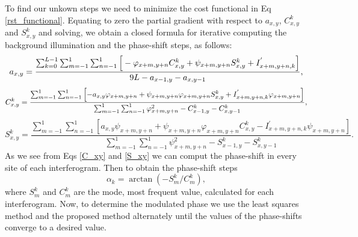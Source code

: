 \documentclass[letterpaper,12pt]{article}   %
\begin{document}
To find our unkown steps we need to minimize the cost functional in Eq 
\ref{rst_functional}. Equating to zero the partial gradient with respect to $a_{x,y}$, 
$C_{x,y}^k$ and $S_{x,y}^k$ and solving, we obtain a closed formula for iterative 
computing the background illumination and the phase-shift steps, as follows:
\begin{equation}
	a_{x,y} = \frac{ \sum_{k=0}^{L-1} \sum_{m=-1}^{1} \sum_{n=-1}^{1} \left[\\
	-\varphi_{x+m,y+n}C_{x,y}^k+\psi_{x+m,y+n}S_{x,y}^k+I_{x+m,y+n,k}^{'} \right] }
	{ 9L - a_{x-1,y}-a_{x,y-1}},
\end{equation}
\begin{equation}\label{C_xy}
	C_{x,y}^k = \frac{ \sum_{m=-1}^{1} \sum_{n=-1}^{1} \left[ -a_{x,y} \varphi_{x+m,y+n}+
	\psi_{x+m,y+n} \varphi_{x+m,y+n} S_{x,y}^k +\\ 		I_{x+m,y+n,k}^{'}
	\varphi_{x+m,y+n} \right] } { \sum_{m=-1}^{1} \sum_{n=-1}^{1} \varphi_{x+m,y+n}^2 -
	C_{x-1,y}^k-C_{x,y-1}^k },
\end{equation}
\begin{equation}\label{S_xy}
	S_{x,y}^k = \frac{ \sum_{m=-1}^{1} \sum_{n=-1}^{1} \left[ a_{x,y} \psi_{x+m,y+n} +
	\psi_{x+m,y+n} \varphi_{x+m,y+n} C_{x,y}^k-I_{x+m,y+n,k}^{'} \psi_{x+m,y+n} \right]}
	{ \sum_{m=-1}^{1} \sum_{n=-1}^{1} \psi_{x+m,y+n}^2 - S_{x-1,y}^k - S_{x,y-1}^k }.
\end{equation}
As we see from Eqs \ref{C_xy} and \ref{S_xy} we can comput the phase-shift in every site
of each interferogram. Then to obtain the phase-shift steps
\begin{equation}
	\alpha_k = \arctan(-S_m^k/C_m^k),
\end{equation}
where $S_m^k$ and $C_m^k$ are the mode, most frequent value, calculated for each
interferogram.
Now, to determine the modulated phase we use the least squares method and the proposed
method alternately until the values ​​of the phase-shifts converge to a desired value.

\end{document}
